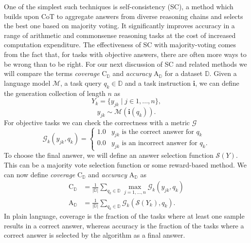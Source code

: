 One of the simplest such techniques is self-consistency\cite{wang2023selfconsistencyimproveschainthought} (SC),
a method which builds upon CoT to aggregate answers from diverse reasoning 
chains and selects the best one based on majority voting. 
It significantly improves accuracy in a range of arithmetic and commonsense reasoning tasks 
at the cost of increased computation expenditure\cite{wang2023selfconsistencyimproveschainthought}.
The effectiveness of SC with majority-voting comes from the fact that, for tasks with objective answers, there are often more ways to be wrong than to be right.
\newpage
For our next discussion of SC and related methods we will compare the 
terms \textit{coverage} $\mathrm{C}_{\mathbb{D}}$ and \textit{accuracy} $\mathrm{A}_{\mathbb{D}}$ for a dataset ${\mathbb{D}}$.
Given a language model $\mathcal{M}$, a task query $q_k \in {\mathbb{D}}$ and a task 
instruction $\mathbf{i}$, we can define the generation collection of length $n$ as
\begin{equation}
    Y_k = \{y_{jk}\mid j \in 1, ..., n\},
\end{equation}
\begin{equation}
    y_{jk} \sim \mathcal{M}(\mathbf{i}(q_k)).
\end{equation}
For objective tasks we can check the correctness with a metric $\mathcal{G}$
\begin{equation}
    \mathcal{G}_{k}(y_{jk}, q_k) = 
    \begin{cases}
        1.0 & y_{jk} \text{ is the correct answer for } q_k\\
        0.0 & y_{jk} \text{ is an incorrect answer for } q_k.
    \end{cases}
\end{equation}
To choose the final answer, we will define an answer selection function $\mathcal{S}(Y)$. 
This can be a majority vote selection function or some reward-based method.
We can now define \textit{coverage} $\mathrm{C}_{\mathbb{D}}$ and \textit{accuracy} $\mathrm{A}_{\mathbb{D}}$ as
\begin{align}
    \mathrm{C}_{\mathbb{D}} &= \frac{1}{|\mathbb{D}|} \sum_{q_k \in \mathbb{D}} \max_{j=1,...,n} \mathcal{G}_k(y_{jk}, q_k) \\
    \mathrm{A}_{\mathbb{D}} &= \frac{1}{|\mathbb{D}|} \sum_{q_k \in \mathbb{D}} \mathcal{G}_k\left( \mathcal{S}(Y_k), q_k \right).
\end{align}
In plain language, coverage is the fraction of the tasks where at least one sample results in a correct answer,
whereas accuracy is the fraction of the tasks where a correct answer is selected by the algorithm as a final answer.

